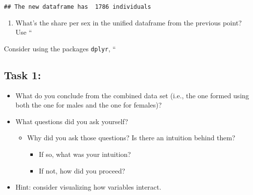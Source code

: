 \documentclass[
]{book}
\newenvironment{Shaded}{\begin{snugshade}}{\end{snugshade}}
\newcommand{\CommentTok}[1]{\textcolor[rgb]{0.56,0.35,0.01}{\textit{#1}}}
\newcommand{\DecValTok}[1]{\textcolor[rgb]{0.00,0.00,0.81}{#1}}
\newcommand{\FunctionTok}[1]{\textcolor[rgb]{0.13,0.29,0.53}{\textbf{#1}}}
\newcommand{\NormalTok}[1]{#1}
\newcommand{\OtherTok}[1]{\textcolor[rgb]{0.56,0.35,0.01}{#1}}
\newcommand{\SpecialCharTok}[1]{\textcolor[rgb]{0.81,0.36,0.00}{\textbf{#1}}}
\newcommand{\StringTok}[1]{\textcolor[rgb]{0.31,0.60,0.02}{#1}}
\providecommand{\tightlist}{%
  \setlength{\itemsep}{0pt}\setlength{\parskip}{0pt}}
\begin{document}
\begin{verbatim}
## The new dataframe has  1786 individuals
\end{verbatim}

\begin{Shaded}
\end{Shaded}

\begin{enumerate}
\def\labelenumi{\arabic{enumi}.}
\setcounter{enumi}{3}
\tightlist
\item
  What's the share per sex in the unified dataframe from the previous point? Use ``
\end{enumerate}

Consider using the packages \texttt{dplyr}, ``

\hypertarget{task-1}{%
\subsection{Task 1:}\label{task-1}}

\begin{itemize}
\tightlist
\item
  What do you conclude from the combined data set (i.e., the one formed using both the one for males and the one for females)?
\item
  What questions did you ask yourself?

  \begin{itemize}
  \tightlist
  \item
    Why did you ask those questions? Is there an intuition behind them?

    \begin{itemize}
    \tightlist
    \item
      If so, what was your intuition?
    \item
      If not, how did you proceed?
    \end{itemize}
  \end{itemize}
\item
  Hint: consider visualizing how variables interact.
\end{itemize}
\end{document}
